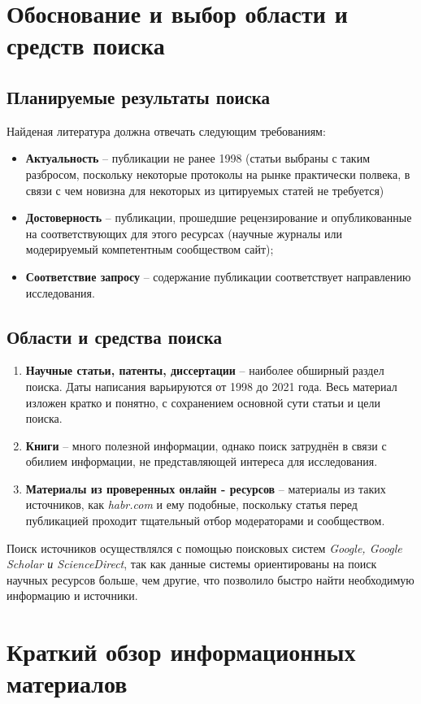 \section{Обоснование и выбор области и средств поиска}
\subsection{Планируемые результаты поиска}
Найденая литература должна отвечать следующим требованиям:
\begin{itemize}
	\item \textbf{Актуальность} -- публикации не ранее 1998 (статьи выбраны с таким разбросом, поскольку некоторые протоколы на рынке практически полвека, в связи с чем новизна для некоторых из цитируемых статей не требуется)
	\item \textbf{Достоверность} -- публикации, прошедшие рецензирование и опубликованные на соответствующих для этого ресурсах (научные журналы или модерируемый компетентным сообществом сайт);
	\item \textbf{Соответствие запросу} -- содержание публикации соответствует направлению исследования.
\end{itemize}
\subsection{Области и средства поиска}
\begin{enumerate}
	\item \textbf{Научные статьи, патенты, диссертации} -- наиболее обширный раздел поиска. Даты написания варьируются	от 1998 до 2021 года. Весь материал изложен кратко и понятно, с сохранением	основной сути статьи и цели поиска.
	\item \textbf{Книги} -- много полезной информации, однако поиск затруднён в связи с обилием информации, не представляющей интереса для исследования.
	\item \textbf{Материалы из проверенных онлайн - ресурсов} -- материалы из таких источников, как \textit{habr.com} и ему подобные, поскольку статья перед публикацией проходит тщательный отбор модераторами и сообществом.
\end{enumerate}

Поиск источников осуществлялся с помощью поисковых систем \textit{Google, Google Scholar и ScienceDirect}, так
как данные системы ориентированы на поиск научных ресурсов больше, чем другие, что позволило быстро найти необходимую информацию и источники.
\pagebreak
\section{Краткий обзор информационных материалов}
